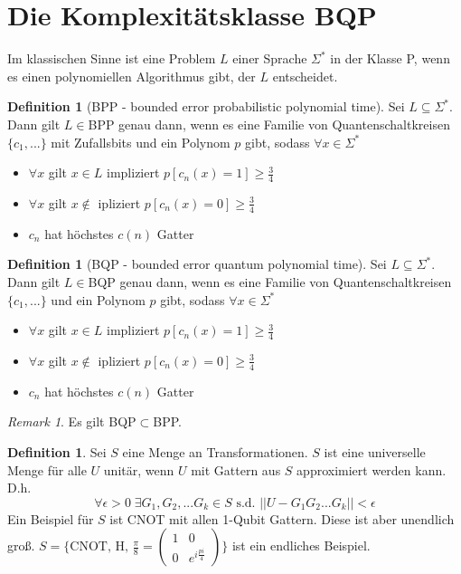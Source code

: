 \documentclass[a4paper, 12pt]{article}
\theoremstyle{plain}
\theoremstyle{definition}
\newtheorem{definition}[theorem]{Definition} %
\theoremstyle{lemma}
\theoremstyle{remark}
\newtheorem{remark}[theorem]{Remark}
\theoremstyle{example}
\begin{document}
	\section{Die Komplexitätsklasse BQP}
	Im klassischen Sinne ist eine Problem $L$ einer Sprache $\Sigma^*$ in der Klasse P, wenn es einen polynomiellen Algorithmus gibt, der $L$ entscheidet.
	\begin{definition}[BPP - bounded error probabilistic polynomial time]
		Sei $L\subseteq \Sigma^*$. Dann gilt $L\in$BPP genau dann, wenn es eine Familie von Quantenschaltkreisen $\{c_1,...\}$ mit Zufallsbits und ein Polynom $p$ gibt, sodass $\forall x \in \Sigma^*$
		\begin{itemize}
			\item $\forall x$ gilt $x \in L$ impliziert $p[c_n(x) = 1] \geq \frac{3}{4}$
			\item $\forall x$ gilt $x \notin $ ipliziert $p[c_n(x) = 0] \geq \frac{3}{4}$
			\item $c_n$ hat höchstes $c(n)$ Gatter
		\end{itemize}
	\end{definition}
	\begin{definition}[BQP - bounded error quantum polynomial time]
		Sei $L\subseteq \Sigma^*$. Dann gilt $L\in$BQP genau dann, wenn es eine Familie von Quantenschaltkreisen $\{c_1,...\}$ und ein Polynom $p$ gibt, sodass $\forall x \in \Sigma^*$ \begin{itemize}
			\item $\forall x$ gilt $x \in L$ impliziert $p[c_n(x) = 1] \geq \frac{3}{4}$
			\item $\forall x$ gilt $x \notin $ ipliziert $p[c_n(x) = 0] \geq \frac{3}{4}$
			\item $c_n$ hat höchstes $c(n)$ Gatter
		\end{itemize}
	\end{definition} 
	\begin{remark}
		Es gilt BQP$\subset$BPP.
	\end{remark}
	\begin{definition}
		Sei $S$ eine Menge an Transformationen. $S$ ist eine universelle Menge für alle $U$ unitär, wenn $U$ mit Gattern aus $S$ approximiert werden kann. D.h. \[\forall \epsilon > 0 \; \exists G_1,G_2,...G_k \in S \text{ s.d. } ||U-G_1G_2...G_k|| < \epsilon\]
		Ein Beispiel für $S$ ist CNOT mit allen 1-Qubit Gattern. Diese ist aber unendlich groß. $S = \{\text{CNOT, H, } \frac{\pi}{8} = \begin{pmatrix}
			1&0\\0&e^{i\frac{pi}{4}}
		\end{pmatrix}\}$ ist ein endliches Beispiel.
	\end{definition}
\end{document}
